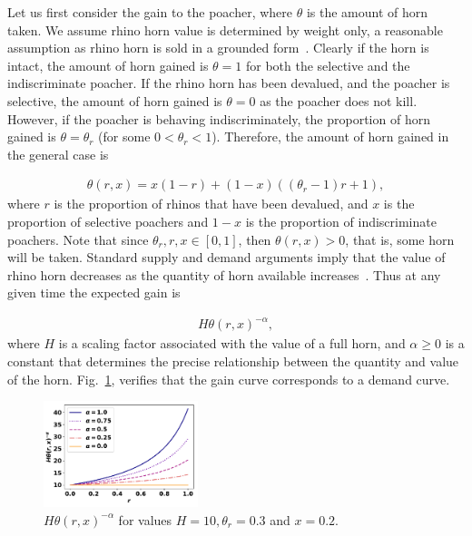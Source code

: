 \documentclass[10pt]{article}
\begin{document}
Let us first consider the gain to the poacher, where \(\theta\) is the amount of
horn taken. We assume rhino horn value is determined by weight only, a
reasonable assumption as rhino horn is sold in a grounded form~\cite{Saverhino}.
Clearly if the horn is intact, the amount of horn gained is \(\theta=1\) for both
the selective and the indiscriminate poacher.
If the rhino horn has been devalued, and the poacher is selective, the amount of
horn gained is \(\theta=0\) as the poacher does not kill. However, if the poacher
is behaving indiscriminately, the proportion of horn gained is \(\theta = \theta_r\)
(for some \(0<\theta_r<1\)). Therefore, the amount of horn gained in the
general case is

\begin{eqnarray}
    \label{eqn:theta}
    \theta(r, x) = x (1 - r) + (1 - x) ((\theta_r - 1) r + 1),
\end{eqnarray}
where \(r\) is the proportion of rhinos that have been devalued, and \(x\) is the
proportion of selective poachers and \(1-x\) is the proportion of indiscriminate
poachers. Note that since \(\theta_r, r, x  \in [0, 1]\), then
\(\theta(r, x) > 0\), that is, some horn will be taken. Standard supply and demand
arguments imply that the value
of rhino horn decreases as the quantity of horn available increases~\cite{mankiw2010}.
Thus at any given time the expected gain is

\begin{eqnarray}
    \label{eqn:individual_gain}
    H \theta(r, x)^{-\alpha},
\end{eqnarray}
where \(H\) is a scaling factor associated with the value of a full horn, and
\(\alpha \geq 0\) is a constant that determines the precise relationship between
the quantity and value of the horn.  Fig.~\ref{fig:GainCurve}, verifies that the
gain curve corresponds to a demand curve.

\begin{figure}[!htbp]
\centering
\includegraphics[width=0.4\textwidth]{images/gain_curve.pdf}
\caption{\label{fig:GainCurve} \(H \theta(r, x) ^{- \alpha}\) for values
\(H = 10, \theta_r = 0.3\) and \(x = 0.2.\)}
\end{figure}
\end{document}
